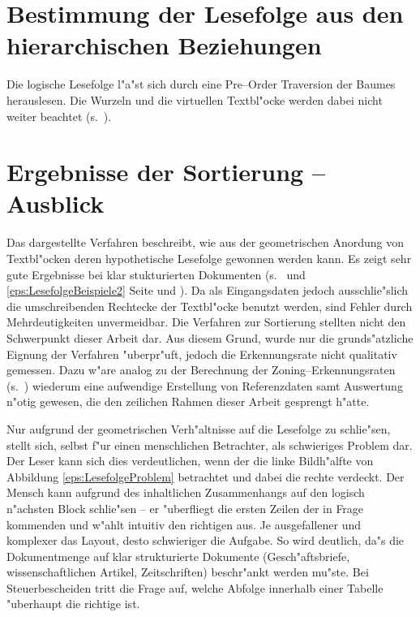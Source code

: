 \section{Bestimmung der Lesefolge aus den hierarchischen Beziehungen}

Die logische Lesefolge l"a"st sich durch eine Pre--Order Traversion der Baumes herauslesen.
Die Wurzeln und die virtuellen Textbl"ocke werden dabei nicht weiter beachtet
(s.\ ).


\section{Ergebnisse der Sortierung -- Ausblick}
Das dargestellte Verfahren beschreibt, wie aus der geometrischen Anordung von Textbl"ocken
deren hypothetische Lesefolge gewonnen werden kann.
Es zeigt sehr gute Ergebnisse bei klar stukturierten Dokumenten
(s.\  und \ref{eps:LesefolgeBeispiele2}
Seite \pageref{eps:LesefolgeBeispiele2} und \pageref{eps:LesefolgeBeispiele}).
Da als Eingangsdaten jedoch ausschlie"slich die umschreibenden Rechtecke der Textbl"ocke benutzt werden, sind Fehler durch Mehrdeutigkeiten unvermeidbar.
Die Verfahren zur Sortierung stellten nicht den Schwerpunkt dieser Arbeit dar. Aus diesem Grund,
wurde nur die grunds"atzliche Eignung der Verfahren "uberpr"uft,
jedoch die Erkennungsrate nicht qualitativ gemessen. 
Dazu w"are analog zu der Berechnung der Zoning--Erkennungsraten 
(s.\ ) wiederum eine aufwendige Erstellung von Referenzdaten samt
Auswertung n"otig gewesen, die den zeilichen Rahmen dieser Arbeit gesprengt h"atte.

Nur aufgrund der geometrischen Verh"altnisse auf die Lesefolge zu schlie"sen, stellt sich,
selbst f"ur einen menschlichen Betrachter, als schwieriges Problem dar. Der Leser kann sich
dies verdeutlichen, wenn der die linke Bildh"alfte von Abbildung \ref{eps:LesefolgeProblem} 
betrachtet und dabei die rechte verdeckt. 
Der Mensch kann aufgrund des inhaltlichen Zusammenhangs auf den
logisch n"achsten Block schlie"sen -- er "uberfliegt die ersten Zeilen der in Frage kommenden
und w"ahlt intuitiv den richtigen aus. Je ausgefallener und komplexer das Layout, desto
schwieriger die Aufgabe. 
So wird deutlich, da"s die Dokumentmenge auf klar strukturierte Dokumente
(Gesch"aftsbriefe, wissenschaftlichen Artikel, Zeitschriften) beschr"ankt werden mu"ste.
Bei Steuerbescheiden tritt die Frage auf, welche Abfolge innerhalb einer Tabelle "uberhaupt 
die richtige ist.

